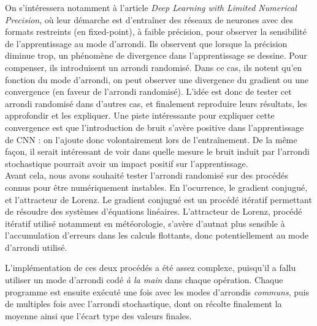 \documentclass[a4paper,11pt]{article}
\begin{document}
On s'intéressera notamment à l'article \textit{Deep Learning with Limited Numerical Precision}\cite{gupta2015deep}, où leur démarche est d'entraîner des réseaux de neurones avec des formats restreints (en fixed-point), à faible précision, pour observer la sensibilité de l’apprentissage au mode d’arrondi.
Ils observent que lorsque la précision diminue trop, un phénomène de divergence dans l'apprentissage se dessine. Pour compenser, ils introduisent un arrondi randomisé.
Dans ce cas, ils notent qu'en fonction du mode d'arrondi, on peut observer une divergence du gradient ou une convergence (en faveur de l'arrondi randomisé).
L’idée est donc de tester cet arrondi randomisé dans d’autres cas, et finalement reproduire leurs résultats, les approfondir et les expliquer.
Une piste intéressante pour expliquer cette convergence est que l’introduction de bruit s’avère positive dans l’apprentissage de CNN : on l’ajoute donc volontairement lors de l’entraînement. De la même façon, il serait intéressant de voir dans quelle mesure le bruit induit par l’arrondi stochastique pourrait avoir un impact positif sur l’apprentissage.
\\
Avant cela, nous avons souhaité tester l’arrondi randomisé sur des procédés connus pour être numériquement instables. En l'ocurrence, le gradient conjugué, et l'attracteur de Lorenz. Le gradient conjugué est un procédé itératif permettant de résoudre des systèmes d’équations linéaires\cite{shewchuk1994introduction}.
L'attracteur de Lorenz, procédé itératif utilisé notamment en météorologie, s'avère d'autnat plus sensible à l'accumulation d'erreurs dans les calculs flottants, donc potentiellement au mode d’arrondi utilisé.

L’implémentation de ces deux procédés a été assez complexe, puisqu’il a fallu utiliser un mode d’arrondi codé \textit{à la main} dans chaque opération.
Chaque programme est ensuite exécuté une fois avec les modes d'arrondis \textit{communs}, puis de multiples fois avec l'arrondi stochastique, dont on récolte finalement la moyenne ainsi que l'écart type des valeurs finales.
\end{document}
